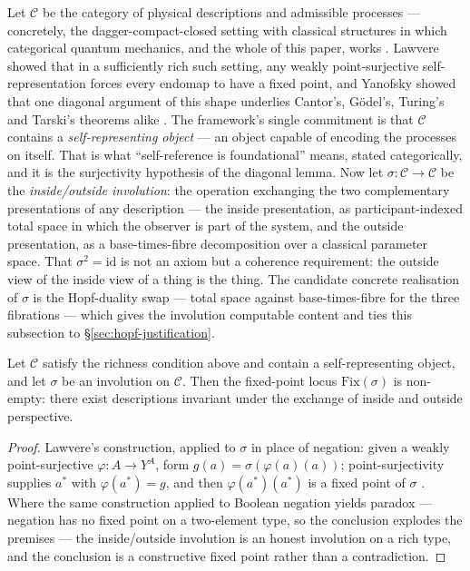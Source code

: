 Let $\mathcal{C}$ be the category of physical descriptions and admissible processes --- concretely,
the dagger-compact-closed setting with classical structures in which categorical quantum mechanics,
and the whole of this paper, works \autocite{CoeckeKissinger2017}. Lawvere showed that in a
sufficiently rich such setting, any weakly point-surjective self-representation forces every
endomap to have a fixed point, and Yanofsky showed that one diagonal argument of this shape
underlies Cantor's, G\"{o}del's, Turing's and Tarski's theorems alike
\autocite{Lawvere_1969,Yanofsky2003,cantor1891diagonal}. The framework's single commitment is that
$\mathcal{C}$ contains a \emph{self-representing object} --- an object capable of encoding the
processes on itself. That is what ``self-reference is foundational'' means, stated categorically,
and it is the surjectivity hypothesis of the diagonal lemma. Now let
$\sigma \colon \mathcal{C} \to \mathcal{C}$ be the \emph{inside/outside involution}: the operation
exchanging the two complementary presentations of any description --- the inside presentation, as
participant-indexed total space in which the observer is part of the system, and the outside
presentation, as a base-times-fibre decomposition over a classical parameter space. That
$\sigma^{2} = \mathrm{id}$ is not an axiom but a coherence requirement: the outside view of the
inside view of a thing is the thing. The candidate concrete realisation of $\sigma$ is the
Hopf-duality swap --- total space against base-times-fibre for the three fibrations --- which gives
the involution computable content and ties this subsection to \S\ref{sec:hopf-justification}.

\begin{proposition}\label{prop:inside-outside}
Let $\mathcal{C}$ satisfy the richness condition above and contain a self-representing object, and
let $\sigma$ be an involution on $\mathcal{C}$. Then the fixed-point locus
$\mathrm{Fix}(\sigma)$ is non-empty: there exist descriptions invariant under the exchange of
inside and outside perspective.
\end{proposition}

\begin{proof}
Lawvere's construction, applied to $\sigma$ in place of negation: given a weakly point-surjective
$\varphi \colon A \to Y^{A}$, form $g(a) = \sigma\!\left(\varphi(a)(a)\right)$; point-surjectivity
supplies $a^{*}$ with $\varphi(a^{*}) = g$, and then $\varphi(a^{*})(a^{*})$ is a fixed point of
$\sigma$ \autocite{Lawvere_1969,Yanofsky2003}. Where the same construction applied to Boolean
negation yields paradox --- negation has no fixed point on a two-element type, so the conclusion
explodes the premises --- the inside/outside involution is an honest involution on a rich type, and
the conclusion is a constructive fixed point rather than a contradiction.
\end{proof}

